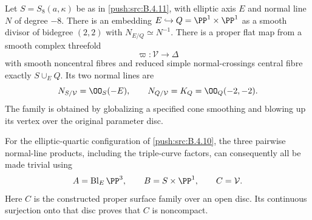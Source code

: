\begin{proposition}\hypertarget{tag-030G}{}\label{push:src:B.4.12}

Let $S=S_8(a,\kappa)$ be as in \ref{push:src:B.4.11}, with elliptic axis $E$
and normal line $N$ of degree $-8$.
There is an embedding $E\hookrightarrow Q=\PP^1\times\PP^1$
as a smooth divisor of bidegree $(2,2)$ with
$N_{E/Q}\simeq N^{-1}$.
There is a proper flat map from a smooth complex threefold
\[
 \varpi:\mathcal V\longrightarrow\Delta
\]
with smooth noncentral fibres and reduced simple normal-crossings
central fibre exactly $S\cup_E Q$.  Its two normal lines are
\[
 N_{S/\mathcal V}=\OO_S(-E),\qquad
 N_{Q/\mathcal V}=K_Q=\OO_Q(-2,-2).
\]
The family is obtained by globalizing a specified cone smoothing
and blowing up its vertex over the original parameter disc.

For the elliptic-quartic configuration of \ref{push:src:B.4.10}, the three
pairwise normal-line products, including the triple-curve factors,
can consequently all be made trivial using
\[
 A=\operatorname{Bl}_E\PP^3,\qquad
 B=S\times\PP^1,\qquad C=\mathcal V.
\]
Here $C$ is the constructed proper surface family over an open
disc. Its continuous surjection onto that disc proves that $C$ is
noncompact.
\end{proposition}


